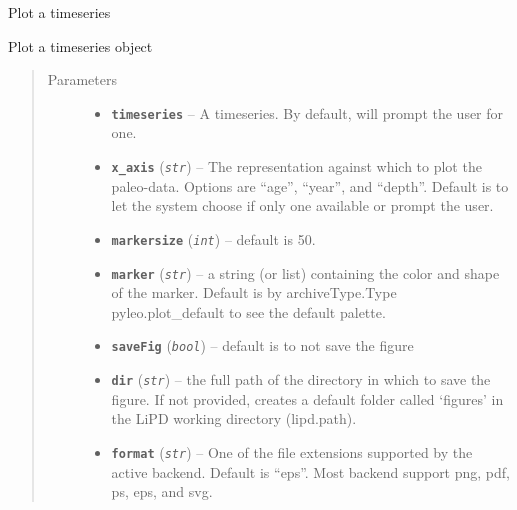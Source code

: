 \documentclass[letterpaper,10pt,english]{sphinxmanual}
\begin{document}
\begin{fulllineitems}
\label{TSPlots:pyleoclim.Plot}
Plot a timeseries

\begin{fulllineitems}
\label{TSPlots:pyleoclim.Plot.plot_Ts}
Plot a timeseries object
\begin{quote}\begin{description}
\item[{Parameters}] \leavevmode\begin{itemize}
\item {} 
\textbf{\texttt{timeseries}} -- A timeseries. By default, will prompt the user for one.

\item {} 
\textbf{\texttt{x\_axis}} (\emph{\texttt{str}}) -- The representation against which to plot the
paleo-data. Options are ``age'', ``year'', and ``depth''.
Default is to let the system choose if only one available or
prompt the user.

\item {} 
\textbf{\texttt{markersize}} (\emph{\texttt{int}}) -- default is 50.

\item {} 
\textbf{\texttt{marker}} (\emph{\texttt{str}}) -- a string (or list) containing the color and shape of
the marker. Default is by archiveType.Type pyleo.plot\_default
to see the default palette.

\item {} 
\textbf{\texttt{saveFig}} (\emph{\texttt{bool}}) -- default is to not save the figure

\item {} 
\textbf{\texttt{dir}} (\emph{\texttt{str}}) -- the full path of the directory in which to save the
figure. If not provided, creates a default folder called
`figures' in the LiPD working directory (lipd.path).

\item {} 
\textbf{\texttt{format}} (\emph{\texttt{str}}) -- One of the file extensions supported by the active
backend. Default is ``eps''. Most backend support png, pdf, ps, eps,
and svg.

\end{itemize}


\end{description}
\end{quote}
\end{fulllineitems}
\end{fulllineitems}
\end{document}
